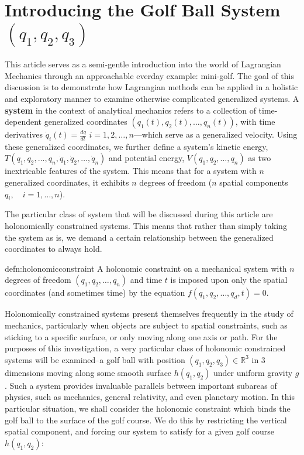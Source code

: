 \section{Introducing the Golf Ball System $(q_1,q_2,q_3)$}

This article serves as a semi-gentle introduction into the world of Lagrangian Mechanics through an approachable everday example: mini-golf. The goal of this discussion is to demonstrate how Lagrangian methods can be applied in a holistic and exploratory manner to examine otherwise complicated generalized systems. A \textbf{system} in the context of analytical mechanics refers to a collection of time-dependent generalized coordinates $(q_1(t), q_2(t), \ldots, q_n(t))$, with time derivatives $\dot q_i(t)=\frac{dq}{dt}$ $i=1,2,\ldots,n$---which serve as a generalized velocity. Using these generalized coordinates, we further define a system's kinetic energy, $T(q_1, q_2,\ldots, q_n,\dot q_1, \dot q_2, \ldots, \dot q_n)$ and potential energy, $V(q_1, q_2, \ldots, q_n)$ as two inextricable features of the system. This means that for a system with $n$ generalized coordinates, it exhibits $n$ degrees of freedom ($n$ spatial components $q_i,\quad i=1,\ldots,n$). 


The particular class of system that will be discussed during this article are holonomically constrained systems. This means that rather than simply taking the system as is, we demand a certain relationship between the generalized coordinates to always hold. 


\begin{smjdefinition}{defn:holonomicconstraint}
		A holonomic constraint on a mechanical system with $n$ degrees of freedom
		$(q_1, q_2, \ldots, q_n)$ and time $t$ is imposed upon only the spatial
		coordinates (and sometimes time) by the equation
		$f(q_1, q_2, \ldots, q_d,t)=0$.
\end{smjdefinition}

Holonomically constrained systems present themselves frequently in the study of mechanics, particularly when objects are subject to spatial constraints, such as sticking to a specific surface, or only moving along one axis or path. For the purposes of this investigation, a very particular class of holonomic constrained systems will be examined--a golf ball with position $(q_1,q_2,q_3)\in\mathbb{R}^3$ in 3 dimensions moving along some smooth surface $h(q_1,q_2)$ under uniform gravity $g$. Such a system provides invaluable parallels between important subareas of physics, such as mechanics, general relativity, and even planetary motion. In this particular situation, we shall consider the holonomic constraint which binds the golf ball to the surface of the golf course. We do this by restricting the vertical spatial component, and forcing our system to satisfy for a given golf course $h(q_1,q_2)$:


